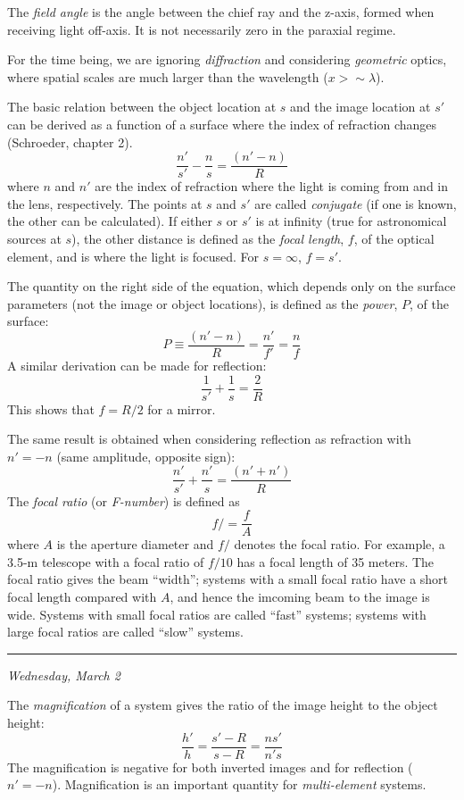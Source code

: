 \documentclass[12pt]{article}
\newcommand{\mydate}[1]{
    \begin{flushright}
        \rule{\textwidth}{0.4pt} %
        \footnotesize\hfill\textit{#1}
    \end{flushright}}
\begin{document}
The \textit{field angle} is the angle between the chief ray and the z-axis,
formed when receiving light off-axis. It is not necessarily zero in the
paraxial regime.

For the time being, we are ignoring \textit{diffraction} and considering
\textit{geometric} optics, where spatial scales are much larger than the
wavelength ($x > \sim\lambda$).

The basic relation between the object location at $s$ and the image location at
$s'$ can be derived as a function of a surface where the index of refraction
changes (Schroeder, chapter 2).
\[
    \frac{n'}{s'}-\frac{n}{s} = \frac{(n'-n)}{R}
    \]
where $n$ and $n'$ are the index of refraction where the light is coming from
and in the lens, respectively. The points at $s$ and $s'$ are called
\textit{conjugate} (if one is known, the other can be calculated). If either $s$
or $s'$ is at infinity (true for astronomical sources at $s$), the other
distance is defined as the \textit{focal length}, $f$, of the optical element,
and is where the light is focused. For $s=\infty$, $f=s'$.

The quantity on the right side of the equation, which depends only on the
surface parameters (not the image or object locations), is defined as the
\textit{power}, $P$, of the surface:
\[
     P \equiv \frac{(n'-n)}{R} = \frac{n'}{f'} = \frac{n}{f}
    \]
A similar derivation can be made for reflection:
\[
     \frac{1}{s'} + \frac{1}{s} = \frac{2}{R}
    \]
This shows that $f = R/2$ for a mirror.

The same result is obtained when considering reflection as refraction with $n'
= -n$ (same amplitude, opposite sign):
\[
    \frac{n'}{s'}+\frac{n'}{s} = \frac{(n'+n')}{R}
    \]
The \textit{focal ratio} (or \textit{F-number}) is defined as
\[
    f/ = \frac{f}{A}
    \]
where $A$ is the aperture diameter and $f/$ denotes the focal ratio. For
example, a 3.5-m telescope with a focal ratio of $f /10$ has a focal length of
35 meters. The focal ratio gives the beam ``width''; systems with a small focal
ratio have a short focal length compared with $A$, and hence the imcoming beam
to the image is wide. Systems with small focal ratios are called ``fast''
systems; systems with large focal ratios are called ``slow'' systems.

\mydate{Wednesday, March 2}

The \textit{magnification} of a system gives the ratio of the image height to
the object height:
\[
    \frac{h'}{h} = \frac{s'-R}{s-R} = \frac{ns'}{n's}
    \]
The magnification is negative for both inverted images and for reflection
($n' = -n$). Magnification is an important quantity for
\textit{multi-element} systems.
\end{document}
